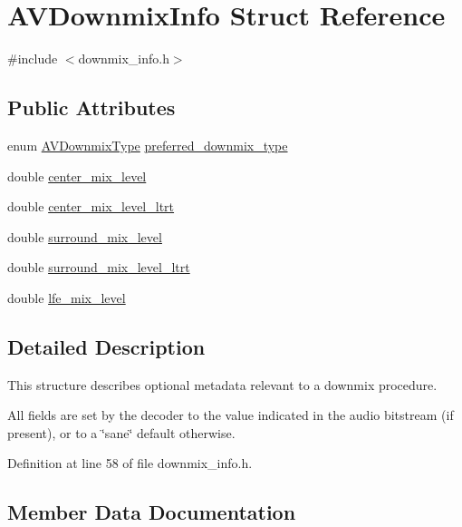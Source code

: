 \hypertarget{struct_a_v_downmix_info}{}\section{A\+V\+Downmix\+Info Struct Reference}
\label{struct_a_v_downmix_info}


{\ttfamily \#include $<$downmix\+\_\+info.\+h$>$}

\subsection*{Public Attributes}
\begin{DoxyCompactItemize}
\item 
enum \hyperlink{group__downmix__info_ga3e3654fedbe3e5485f00ea09396c3521}{A\+V\+Downmix\+Type} \hyperlink{struct_a_v_downmix_info_aca0497b3d08ecb717c349c2bcc946038}{preferred\+\_\+downmix\+\_\+type}
\item 
double \hyperlink{struct_a_v_downmix_info_ac895caaffbfe271f3b710453a5e4db52}{center\+\_\+mix\+\_\+level}
\item 
double \hyperlink{struct_a_v_downmix_info_afe5bab2b99df66c400d53acef4e67ab7}{center\+\_\+mix\+\_\+level\+\_\+ltrt}
\item 
double \hyperlink{struct_a_v_downmix_info_a763db6d7fd875324fff1c1cd124ac21f}{surround\+\_\+mix\+\_\+level}
\item 
double \hyperlink{struct_a_v_downmix_info_a460f7ab05d6c71112f2282aeb4009445}{surround\+\_\+mix\+\_\+level\+\_\+ltrt}
\item 
double \hyperlink{struct_a_v_downmix_info_a070b6f29f4a4d272894d60d678a13a03}{lfe\+\_\+mix\+\_\+level}
\end{DoxyCompactItemize}


\subsection{Detailed Description}
This structure describes optional metadata relevant to a downmix procedure.

All fields are set by the decoder to the value indicated in the audio bitstream (if present), or to a \char`\"{}sane\char`\"{} default otherwise. 

Definition at line 58 of file downmix\+\_\+info.\+h.



\subsection{Member Data Documentation}
